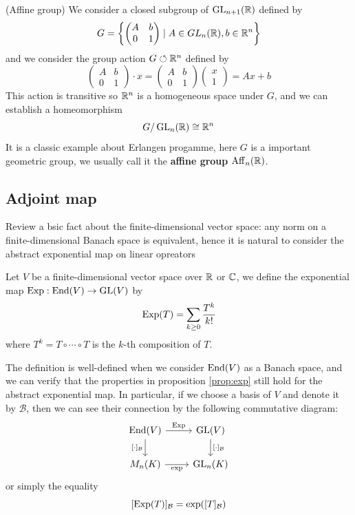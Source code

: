\begin{example} (Affine group)
    We consider a closed subgroup of \(\operatorname{GL}_{n+1}(\mathbb{R})\) defined by
\[G = \left\{\begin{pmatrix}A & b \\ 0 & 1\end{pmatrix} \mid A \in GL_n(\mathbb{R}), b \in \mathbb{R}^n\right\}\]
and we consider the group action \(G \circlearrowleft \mathbb{R}^n\) defined by
\[\begin{pmatrix}
    A & b\\
    0 & 1
\end{pmatrix}\cdot x = \begin{pmatrix}
    A & b\\
    0 & 1
\end{pmatrix}\begin{pmatrix}
    x\\
    1
\end{pmatrix} = Ax +b\]
This action is transitive so \(\mathbb{R}^n\) is a homogeneous space under \(G\), and we can establish a homeomorphism
\[G/\operatorname{GL}_n(\mathbb{R}) \cong \mathbb{R}^n\]
It is a classic example about Erlangen progamme, here \(G\) is a important geometric group, we usually call it the \textbf{affine group} \(\mathrm{Aff}_n(\mathbb{R})\).
\end{example}

\subsection{Adjoint map}
Review a bsic fact about the finite-dimensional vector space: any norm on a finite-dimensional Banach space is equivalent, hence it is natural to consider the abstract exponential map on linear opreators

\begin{definition}
    Let \(V\) be a finite-dimensional vector space over \(\mathbb{R}\) or \(\mathbb{C}\), we define the exponential map \(\operatorname{Exp}: \operatorname{End}(V) \to \operatorname{GL}(V)\) by
    \[\operatorname{Exp}(T)  = \sum_{k \geq 0} \frac{T^k}{k!}\]
    where \(T^k = T\circ \cdots \circ T\) is the \(k\)-th composition of \(T\).
\end{definition}

The definition is well-defined when we consider \(\operatorname{End}(V)\) as a Banach space, and we can verify that the properties in proposition \ref{prop:exp} still hold for the abstract exponential map. In particular, if we choose a basis of \(V\) and denote it by \(\mathcal{B}\), then we can see their connection by the following commutative diagram:
\[\begin{tikzcd}
	{\mathrm{End}(V)} & {\mathrm{GL}(V)} \\
	{M_n(K)} & {\mathrm{GL}_n(K)}
	\arrow["{\mathrm{Exp}}", from=1-1, to=1-2]
	\arrow["{[\cdot]_{\mathcal{B}}}"', from=1-1, to=2-1]
	\arrow["{[\cdot]_{\mathcal{B}}}", from=1-2, to=2-2]
	\arrow["\exp"', from=2-1, to=2-2]
\end{tikzcd}\]
or simply the equality \[[\operatorname{Exp}(T)]_{\mathcal{B}} = \exp([T]_{\mathcal{B}})\]


